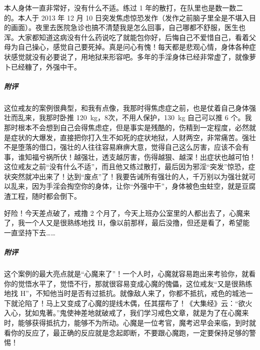 \begin{case}
    本人身体一直非常好，没有什么不适。练过 1 年的散打，在队里也是数一数二的。本人于 2013 年 12 月 10 日突发焦虑惊恐发作（发作之前脑子里全是不堪入目的画面）。夜里去医院急诊也搞不清楚我是怎么回事，自己哪都不舒服，医生也浑。大家都知道这病没有什么药说吃了就能包你好，后悔自己不爱惜自己，看着父母为自己操心，感觉自己要死掉。真是问心有愧！每天都是悲观心情，身体各种症状感觉就没有必要说了，用地狱来形容吧。多年的手淫身体已经非常虚了，就像萝卜已经糠了，外强中干。
    \subparagraph{附评} 这位戒友的案例很典型，和我有点像，我那时得焦虑症之前，也是仗着自己身体强壮而乱来，我那时卧推 \SI{120}{\kilo\gram}，8次，不用人保护，\SI{130}{\kilo\gram} 自己可以推 6 个。我那时根本不会想到自己会得焦虑症，但是事实是残酷的，伤精到一定程度，必然就是症状的大爆发，直接把你打入生不如死的症状地狱，人财两空，非常痛苦。强壮不是堕落的借口，强壮的人往往容易麻痹大意，觉得自己这么厉害，应该不会有事，谁知福兮祸所伏！越强壮，透支越厉害，伤得越狠、越深！出症状也越可怕！这位戒友之前“没有什么不适”，而且他又练过散打，最后因为邪淫“突发”惊恐，症状突然就冲出来了！达到“废点”了！我要告诫所有强壮的人，千万别以为强壮就可以乱来，因为手淫会掏空你的身体，让你“外强中干”，身体被色虫蛀空，就是豆腐渣工程，随时都会倒下。
\end{case}

\begin{case}
    好险！今天差点破了，戒撸 2 个月了，今天上班办公室里的人都出去了，心魔来了，我一个人又是很熟练地找 H，像以前那样，最后没撸，但还是看了，希望能一直坚持下去……
    \subparagraph{附评} 这个案例的最大亮点就是“心魔来了”！一个人时，心魔就容易跑出来考验你，就看你的觉悟水平了，觉悟不行，那就很容易变成心魔的傀儡，这位戒友“又是很熟练地找 H”，不知他当时是否有过抵抗。就像敌人来了，你都不抵抗，戒色的城池一下就沦陷了！马上又变成了心魔的提线木偶，任其摆布了！《大集经》云：“欲火入心，犹如鬼著。”鬼使神差地就破戒了，我们学习戒色文章，就是为了在心魔来时，能够获得抵抗力，能够不为所动。心魔是一位考官，魔考迟早会来临，到时就看你的反应了，最正确的反应就是念起即断，不要跟心魔跑，一定要保持足够的警惕！
\end{case}

